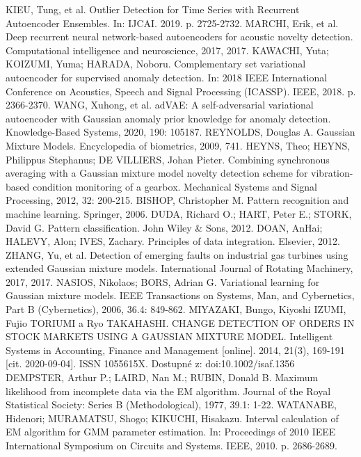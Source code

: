 \documentclass[11pt,twoside,openright]{report}
\begin{document}
\begin{thebibliography}{L}
KIEU, Tung, et al. Outlier Detection for Time Series with Recurrent Autoencoder Ensembles. In: IJCAI. 2019. p. 2725-2732.
MARCHI, Erik, et al. Deep recurrent neural network-based autoencoders for acoustic novelty detection. Computational intelligence and neuroscience, 2017, 2017.
KAWACHI, Yuta; KOIZUMI, Yuma; HARADA, Noboru. Complementary set variational autoencoder for supervised anomaly detection. In: 2018 IEEE International Conference on Acoustics, Speech and Signal Processing (ICASSP). IEEE, 2018. p. 2366-2370.
WANG, Xuhong, et al. adVAE: A self-adversarial variational autoencoder with Gaussian anomaly prior knowledge for anomaly detection. Knowledge-Based Systems, 2020, 190: 105187.
REYNOLDS, Douglas A. Gaussian Mixture Models. Encyclopedia of biometrics, 2009, 741.
HEYNS, Theo; HEYNS, Philippus Stephanus; DE VILLIERS, Johan Pieter. Combining synchronous averaging with a Gaussian mixture model novelty detection scheme for vibration-based condition monitoring of a gearbox. Mechanical Systems and Signal Processing, 2012, 32: 200-215.
BISHOP, Christopher M. Pattern recognition and machine learning. Springer, 2006.
DUDA, Richard O.; HART, Peter E.; STORK, David G. Pattern classification. John Wiley \& Sons, 2012.
DOAN, AnHai; HALEVY, Alon; IVES, Zachary. Principles of data integration. Elsevier, 2012.
ZHANG, Yu, et al. Detection of emerging faults on industrial gas turbines using extended Gaussian mixture models. International Journal of Rotating Machinery, 2017, 2017.
NASIOS, Nikolaos; BORS, Adrian G. Variational learning for Gaussian mixture models. IEEE Transactions on Systems, Man, and Cybernetics, Part B (Cybernetics), 2006, 36.4: 849-862.
MIYAZAKI, Bungo, Kiyoshi IZUMI, Fujio TORIUMI a Ryo TAKAHASHI. CHANGE DETECTION OF ORDERS IN STOCK MARKETS USING A GAUSSIAN MIXTURE MODEL. Intelligent Systems in Accounting, Finance and Management [online]. 2014, 21(3), 169-191 [cit. 2020-09-04]. ISSN 1055615X. Dostupné z: doi:10.1002/isaf.1356
DEMPSTER, Arthur P.; LAIRD, Nan M.; RUBIN, Donald B. Maximum likelihood from incomplete data via the EM algorithm. Journal of the Royal Statistical Society: Series B (Methodological), 1977, 39.1: 1-22.
WATANABE, Hidenori; MURAMATSU, Shogo; KIKUCHI, Hisakazu. Interval calculation of EM algorithm for GMM parameter estimation. In: Proceedings of 2010 IEEE International Symposium on Circuits and Systems. IEEE, 2010. p. 2686-2689.

\end{thebibliography}
\end{document}
